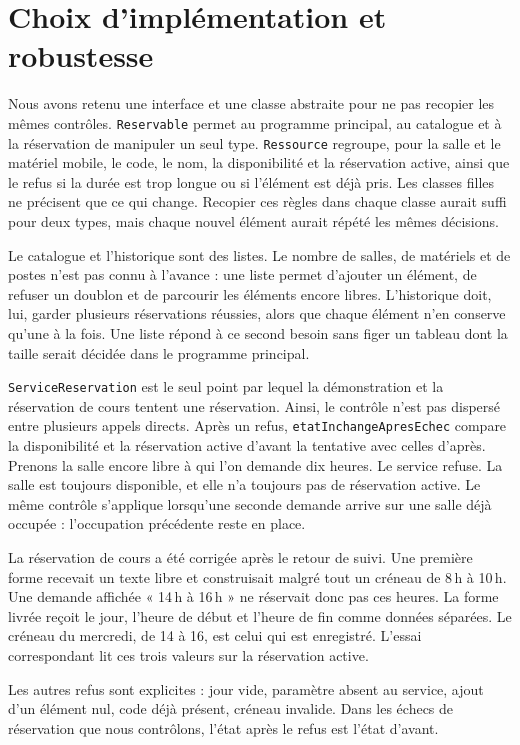 \documentclass[11pt,a4paper]{article}
\begin{document}
\section{Choix d'implémentation et robustesse}

Nous avons retenu une interface et une classe abstraite pour ne pas recopier les mêmes contrôles. \texttt{Reservable} permet au programme principal, au catalogue et à la réservation de manipuler un seul type. \texttt{Ressource} regroupe, pour la salle et le matériel mobile, le code, le nom, la disponibilité et la réservation active, ainsi que le refus si la durée est trop longue ou si l'élément est déjà pris. Les classes filles ne précisent que ce qui change. Recopier ces règles dans chaque classe aurait suffi pour deux types, mais chaque nouvel élément aurait répété les mêmes décisions.

Le catalogue et l'historique sont des listes. Le nombre de salles, de matériels et de postes n'est pas connu à l'avance : une liste permet d'ajouter un élément, de refuser un doublon et de parcourir les éléments encore libres. L'historique doit, lui, garder plusieurs réservations réussies, alors que chaque élément n'en conserve qu'une à la fois. Une liste répond à ce second besoin sans figer un tableau dont la taille serait décidée dans le programme principal.

\texttt{ServiceReservation} est le seul point par lequel la démonstration et la réservation de cours tentent une réservation. Ainsi, le contrôle n'est pas dispersé entre plusieurs appels directs. Après un refus, \texttt{etatInchangeApresEchec} compare la disponibilité et la réservation active d'avant la tentative avec celles d'après. Prenons la salle encore libre à qui l'on demande dix heures. Le service refuse. La salle est toujours disponible, et elle n'a toujours pas de réservation active. Le même contrôle s'applique lorsqu'une seconde demande arrive sur une salle déjà occupée : l'occupation précédente reste en place.

La réservation de cours a été corrigée après le retour de suivi. Une première forme recevait un texte libre et construisait malgré tout un créneau de 8\,h à 10\,h. Une demande affichée « 14\,h à 16\,h » ne réservait donc pas ces heures. La forme livrée reçoit le jour, l'heure de début et l'heure de fin comme données séparées. Le créneau du mercredi, de 14 à 16, est celui qui est enregistré. L'essai correspondant lit ces trois valeurs sur la réservation active.

Les autres refus sont explicites : jour vide, paramètre absent au service, ajout d'un élément nul, code déjà présent, créneau invalide. Dans les échecs de réservation que nous contrôlons, l'état après le refus est l'état d'avant.
\end{document}
